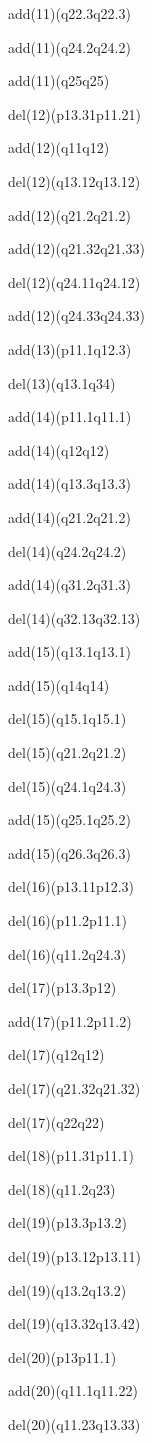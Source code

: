 \documentclass[]{article}
\begin{document}
add(11)(q22.3q22.3)

add(11)(q24.2q24.2)

add(11)(q25q25)

del(12)(p13.31p11.21)

add(12)(q11q12)

del(12)(q13.12q13.12)

add(12)(q21.2q21.2)

add(12)(q21.32q21.33)

del(12)(q24.11q24.12)

add(12)(q24.33q24.33)

add(13)(p11.1q12.3)

del(13)(q13.1q34)

add(14)(p11.1q11.1)

add(14)(q12q12)

add(14)(q13.3q13.3)

add(14)(q21.2q21.2)

del(14)(q24.2q24.2)

add(14)(q31.2q31.3)

del(14)(q32.13q32.13)

add(15)(q13.1q13.1)

add(15)(q14q14)

del(15)(q15.1q15.1)

del(15)(q21.2q21.2)

del(15)(q24.1q24.3)

add(15)(q25.1q25.2)

add(15)(q26.3q26.3)

del(16)(p13.11p12.3)

del(16)(p11.2p11.1)

del(16)(q11.2q24.3)

del(17)(p13.3p12)

add(17)(p11.2p11.2)

del(17)(q12q12)

del(17)(q21.32q21.32)

del(17)(q22q22)

del(18)(p11.31p11.1)

del(18)(q11.2q23)

del(19)(p13.3p13.2)

del(19)(p13.12p13.11)

del(19)(q13.2q13.2)

del(19)(q13.32q13.42)

del(20)(p13p11.1)

add(20)(q11.1q11.22)

del(20)(q11.23q13.33)
\end{document}
